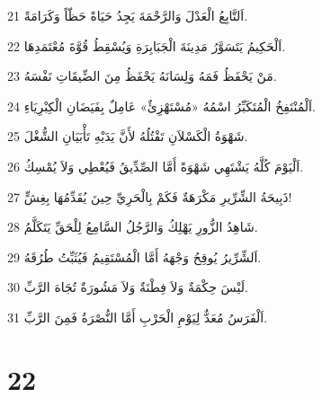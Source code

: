 \par 21 اَلتَّابِعُ الْعَدْلَ وَالرَّحْمَةَ يَجِدُ حَيَاةً حَظّاً وَكَرَامَةً.
\par 22 اَلْحَكِيمُ يَتَسَوَّرُ مَدِينَةَ الْجَبَابِرَةِ وَيُسْقِطُ قُوَّةَ مُعْتَمَدِهَا.
\par 23 مَنْ يَحْفَظُ فَمَهُ وَلِسَانَهُ يَحْفَظُ مِنَ الضِّيقَاتِ نَفْسَهُ.
\par 24 اَلْمُنْتَفِخُ الْمُتَكَبِّرُ اسْمُهُ «مُسْتَهْزِئٌ» عَامِلٌ بِفَيَضَانِ الْكِبْرِيَاءِ.
\par 25 شَهْوَةُ الْكَسْلاَنِ تَقْتُلُهُ لأَنَّ يَدَيْهِ تَأْبَيَانِ الشُّغْلَ.
\par 26 اَلْيَوْمَ كُلَّهُ يَشْتَهِي شَهْوَةً أَمَّا الصِّدِّيقُ فَيُعْطِي وَلاَ يُمْسِكُ.
\par 27 ذَبِيحَةُ الشِّرِّيرِ مَكْرَهَةٌ فَكَمْ بِالْحَرِيِّ حِينَ يُقَدِّمُهَا بِغِشٍّ!
\par 28 شَاهِدُ الزُّورِ يَهْلِكُ وَالرَّجُلُ السَّامِعُ لِلْحَقِّ يَتَكَلَّمُ.
\par 29 اَلشِّرِّيرُ يُوقِحُ وَجْهَهُ أَمَّا الْمُسْتَقِيمُ فَيُثَبِّتُ طُرُقَهُ.
\par 30 لَيْسَ حِكْمَةٌ وَلاَ فِطْنَةٌ وَلاَ مَشُورَةٌ تُجَاهَ الرَّبِّ.
\par 31 اَلْفَرَسُ مُعَدٌّ لِيَوْمِ الْحَرْبِ أَمَّا النُّصْرَةُ فَمِنَ الرَّبِّ.

\chapter{22}

